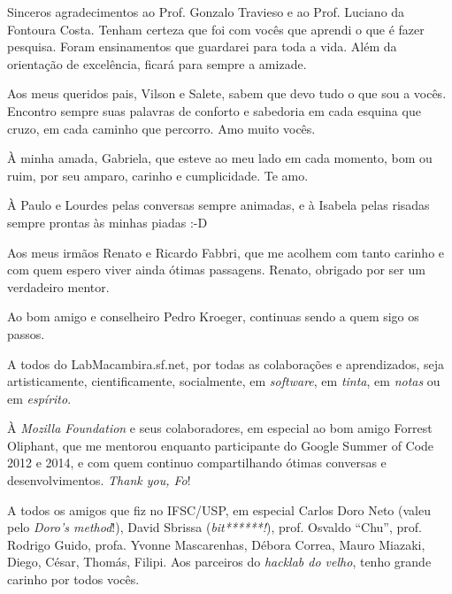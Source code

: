 
Sinceros agradecimentos ao Prof. Gonzalo Travieso e ao Prof. Luciano da Fontoura
Costa. Tenham certeza que foi com vocês que aprendi o que é fazer
pesquisa. Foram ensinamentos que guardarei para toda a vida. Além da orientação
de excelência, ficará para sempre a amizade.

\vspace{4 mm}

Aos meus queridos pais, Vilson e Salete, sabem que devo tudo o que sou a
vocês. Encontro sempre suas palavras de conforto e sabedoria em cada esquina que
cruzo, em cada caminho que percorro. Amo muito vocês.

\vspace{4 mm}

À minha amada, Gabriela, que esteve ao meu lado em cada momento, bom ou ruim,
por seu amparo, carinho e cumplicidade. Te amo.

\vspace{4 mm}

À Paulo e Lourdes pelas conversas sempre animadas, e à Isabela pelas
risadas sempre prontas às minhas piadas :-D

\vspace{4 mm}

Aos meus irmãos Renato e Ricardo Fabbri, que me acolhem com tanto carinho e com
quem espero viver ainda ótimas passagens. Renato, obrigado por ser um verdadeiro
mentor.

\vspace{4 mm}

Ao bom amigo e conselheiro Pedro Kroeger, continuas sendo a quem sigo os passos.

\vspace{4 mm}

A todos do LabMacambira.sf.net, por todas as colaborações e aprendizados, seja
artisticamente, cientificamente, socialmente, em \emph{software},
em \emph{tinta}, em \emph{notas} ou em \emph{espírito}.

\vspace{4 mm}

À \textit{Mozilla Foundation} e seus colaboradores, em especial ao bom amigo Forrest
Oliphant, que me mentorou enquanto participante do Google Summer of Code 2012 e 2014, e
com quem continuo compartilhando ótimas conversas e desenvolvimentos. \textit{Thank you, Fo}!

\vspace{4 mm}

A todos os amigos que fiz no IFSC/USP, em especial Carlos Doro Neto (valeu
pelo \textit{Doro's method}!), David Sbrissa (\textit{bit******!}),
prof. Osvaldo ``Chu'', prof. Rodrigo Guido, profa. Yvonne Mascarenhas, Débora
Correa, Mauro Miazaki, Diego, César, Thomás, Filipi. Aos parceiros
do \textit{hacklab do velho}, tenho grande carinho por todos vocês.

